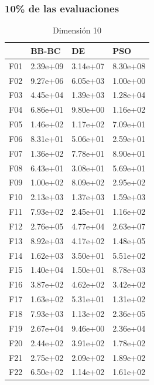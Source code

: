 \subsubsection*{10\% de las evaluaciones}

\begin{table}[H]
    \begin{minipage}{.5\linewidth}
      \caption{Dimensión 10}
      \centering
      \begin{tabular}{llll}
        \toprule
        {} &     BB-BC &        DE &       PSO \\
        \midrule
        F01  &  2.39e+09 &  3.14e+07 &  8.30e+08 \\
        F02  &  9.27e+06 &  6.05e+03 &  1.00e+00 \\
        F03  &  4.45e+04 &  1.39e+03 &  1.28e+04 \\
        F04  &  6.86e+01 &  9.80e+00 &  1.16e+02 \\
        F05  &  1.46e+02 &  1.17e+02 &  7.09e+01 \\
        F06  &  8.31e+01 &  5.06e+01 &  2.59e+01 \\
        F07  &  1.36e+02 &  7.78e+01 &  8.90e+01 \\
        F08  &  6.43e+01 &  3.08e+01 &  5.69e+01 \\
        F09  &  1.00e+02 &  8.09e+02 &  2.95e+02 \\
        F10  &  2.13e+03 &  1.37e+03 &  1.59e+03 \\
        F11  &  7.93e+02 &  2.45e+01 &  1.16e+02 \\
        F12  &  2.76e+05 &  4.77e+04 &  2.63e+07 \\
        F13  &  8.92e+03 &  4.17e+02 &  1.48e+05 \\
        F14  &  1.62e+03 &  3.50e+01 &  5.51e+02 \\
        F15  &  1.40e+04 &  1.50e+01 &  8.78e+03 \\
        F16  &  3.87e+02 &  4.62e+02 &  3.42e+02 \\
        F17  &  1.63e+02 &  5.31e+01 &  1.31e+02 \\
        F18  &  7.93e+03 &  1.13e+02 &  2.36e+05 \\
        F19  &  2.67e+04 &  9.46e+00 &  2.36e+04 \\
        F20  &  2.44e+02 &  3.91e+02 &  1.78e+02 \\
        F21  &  2.75e+02 &  2.09e+02 &  1.89e+02 \\
        F22  &  6.50e+02 &  1.14e+02 &  1.61e+02 \\

\end{tabular}
\end{minipage}
\end{table}
